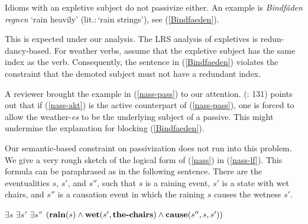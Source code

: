 \documentclass[output=paper]{langsci/langscibook}
\begin{document}
Idioms with an  expletive subject do not passivize either. An example is \textit{Bindf\"aden regnen} `rain heavily' (lit.:\,`rain strings'), see (\ref{Bindfaeden}).

\begin{exe}
\end{exe}


This is expected under our analysis. The  LRS analysis of expletives is redun-dancy-based. For weather verbs, \cite{Levine:al:LRS} assume that the  expletive subject has the same index as the verb. Consequently, the sentence in (\ref{Bindfaeden}) violates the constraint that the demoted subject must not have a redundant index.

A reviewer brought the example in (\ref{nass-pass}) to our attention. \citeauthor{Mueller:02} (\citeyear{Mueller:02}: 131) points out that if (\ref{nass-akt}) is the active counterpart of (\ref{nass-pass}), one is forced to allow the weather-\textit{es} to be the underlying subject of a passive. This might undermine the explanation for blocking (\ref{Bindfaeden}).

\begin{exe}
\ex\label{nass}
\begin{xlist}
\end{xlist}
\end{exe}

Our semantic-based constraint on passivization does not run into this problem. We give a very rough sketch of the logical form of (\ref{nass}) in (\ref{nass-lf}). This formula can be paraphrased as in the following sentence. There are the eventualities $s$, $s'$, and $s''$, such that $s$ is a raining event, $s'$ is a state with wet chairs, and $s''$ is a causation event in which the raining $s$ causes the wetness $s'$. 

\begin{exe}
\ex \label{nass-lf}
 $\exists s $ $\exists s'$ $ \exists s''$ $(\mathbf{rain}(s) \wedge \mathbf{wet}(s',\mathbf{the\mbox{\textbf{-}}chairs}) \wedge \mathbf{cause}(s'',s,s'))$
\end{exe}
\end{document}
